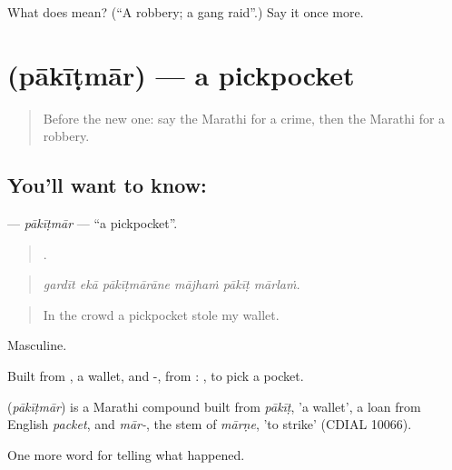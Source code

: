 \begin{tcolorbox}[breakable,colback=teal!4,colframe=teal!35!black,title={Before you move on}]
What does  mean? (\textquotedblleft{}A robbery; a gang raid\textquotedblright{}.) Say it once more.
\end{tcolorbox}
\section[\texorpdfstring{\mr{पाकीटमार} (pākīṭmār)}{पाकीटमार (pākīṭmār)}]{ (pākīṭmār) — a pickpocket}

\label{lesson:MR-C289-pakitmar}



\begin{quote}
Before the new one: say the Marathi for a crime, then the Marathi for a robbery.
\end{quote}

\subsection*{You'll want to know: }
\textbf{} — \emph{pākīṭmār} — \textquotedblleft{}a pickpocket\textquotedblright{}.

\begin{quote}
     .
\end{quote}

\begin{quote}
\emph{gardīt ekā pākīṭmārāne mājhaṁ pākīṭ mārlaṁ.}
\end{quote}

\begin{quote}
In the crowd a pickpocket stole my wallet.
\end{quote}

Masculine.

Built from , a wallet, and -, from :  , to pick a pocket.

\begin{cousinweb}
\textbf{} (\emph{pākīṭmār}) is a Marathi compound built from \emph{pākīṭ}, 'a wallet', a loan from English \emph{packet}, and \emph{mār-}, the stem of \emph{mārṇe}, 'to strike' (CDIAL 10066).
\end{cousinweb}

\begin{grammarlens}[title={What you've built}]
One more word for telling what happened.
\end{grammarlens}

